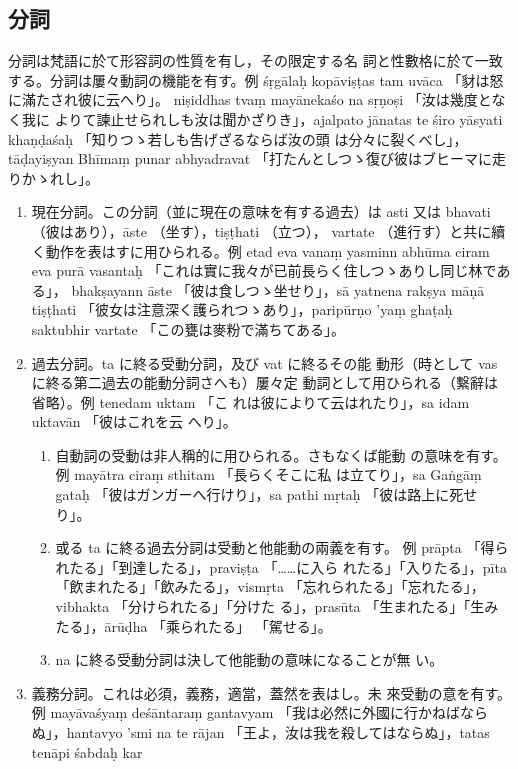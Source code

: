 \subsection{分詞}
\numberParagraph \label{np:232}
分詞は梵語に於て形容詞の性質を有し，その限定する名
詞と性數格に於て一致する。分詞は屢々動詞の機能を有す。例
śṛgālaḥ kopāviṣṭas tam uvāca 「豺は怒に滿たされ彼に云へり」。
niṣiddhas tvaṃ mayānekaśo na sṛṇoṣi 「汝は幾度となく我に
よりて諫止せられしも汝は聞かざりき」，ajalpato jānatas te
śiro yāsyati khaṇḍaśaḥ 「知りつゝ若しも吿げざるならば汝の頭
は分々に裂くべし」，tāḍayiṣyan Bhīmaṃ punar abhyadravat
「打たんとしつゝ復び彼はブヒーマに走りかゝれし」。
\begin{enumerate}[label=(\arabic*)]
\item 現在分詞。この分詞（並に現在の意味を有する過去）は
asti 又は bhavati （彼はあり），āste （坐す），tiṣṭhati （立つ），
vartate （進行す）と共に續く動作を表はすに用ひられる。例
etad eva vanaṃ yasminn abhūma ciram eva purā vasantaḥ
「これは實に我々が已前長らく住しつゝありし同じ林である」，
bhakṣayann āste 「彼は食しつゝ坐せり」，sā yatnena rakṣya\-%
māṇā tiṣṭhati 「彼女は注意深く護られつゝあり」，paripūrṇo
'yaṃ ghaṭaḥ saktubhir vartate 「この甕は麥粉で滿ちてある」。
\item 過去分詞。ta に終る受動分詞，及び vat に終るその能
動形（時として vas に終る第二過去の能動分詞さへも）屢々定
動詞として用ひられる（繫辭は省略）。例 tenedam uktam 「こ
れは彼によりて云はれたり」，sa idam uktavān 「彼はこれを云
へり」。
\begin{enumerate}[label=(\alph*)]
\item 自動詞の受動は非人稱的に用ひられる。さもなくば能動
の意味を有す。例 mayātra ciraṃ sthitam 「長らくそこに私
は立てり」，sa Gaṅgāṃ gataḥ 「彼はガンガーへ行けり」，sa
pathi mṛtaḥ 「彼は路上に死せり」。
\item 或る ta に終る過去分詞は受動と他能動の兩義を有す。
例 prāpta 「得られたる」「到達したる」，praviṣṭa 「……に入ら
れたる」「入りたる」，pīta 「飲まれたる」「飲みたる」，vismṛta
「忘れられたる」「忘れたる」，vibhakta 「分けられたる」「分けた
る」，prasūta 「生まれたる」「生みたる」，ārūḍha 「乘られたる」
「駕せる」。
\item na に終る受動分詞は決して他能動の意味になることが無
い。
\end{enumerate}
\item 義務分詞。これは必須，義務，適當，蓋然を表はし。未
來受動の意を有す。例 mayāvaśyaṃ deśāntaraṃ gantavyam
「我は必然に外國に行かねばならぬ」，hantavyo 'smi na te rājan
「王よ，汝は我を殺してはならぬ」，tatas tenāpi śabdaḥ kar\-%

\end{enumerate}
